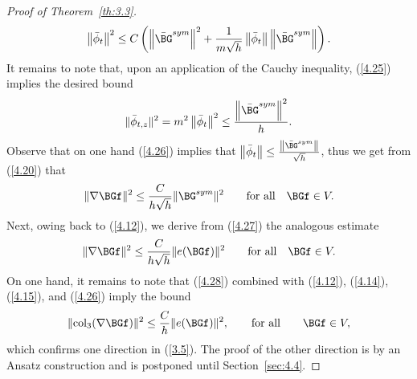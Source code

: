 \begin{proof}[Proof of Theorem~{\ref{th:3.3}}]
\begin{equation}
\label{4.25}
\norm{\bar\phi_t}^2\leq C\left(\norm{\bar\BG^{sym}}^2+\frac{1}{m\sqrt{h}}\norm{\bar\phi_t}\norm{\bar\BG^{sym}}\right).
\end{equation}
It remains to note that, upon an application of the Cauchy inequality, (\ref{4.25}) implies the desired bound
\begin{equation}
\label{4.26}
\|\bar \phi_{t,z}\|^2=m^2\norm{\bar \phi_t}^2\leq \frac{\norm{\bar \BG^{sym}}^2}{h}.
\end{equation}
Observe that on one hand (\ref{4.26}) implies that $\norm{\bar \phi_t}\leq \frac{\norm{\bar \BG^{sym}}}{\sqrt{h}}$, thus we get from (\ref{4.20}) that
\begin{equation}
\label{4.27}
\|\nabla\BGf\|^2\leq \frac{C}{h\sqrt{h}}\|\BG^{sym}\|^2 \qquad\text{for all}\quad \BGf\in V.
\end{equation}
Next, owing back to (\ref{4.12}), we derive from (\ref{4.27}) the analogous estimate 
\begin{equation}
\label{4.28}
\|\nabla\BGf\|^2\leq \frac{C}{h\sqrt{h}}\|e(\BGf)\|^2 \qquad\text{for all}\quad \BGf\in V.
\end{equation}
On one hand, it remains to note that (\ref{4.28}) combined with (\ref{4.12}), (\ref{4.14}), (\ref{4.15}), and (\ref{4.26}) imply the bound 
\begin{equation}
\label{4.29}
\|\mathrm{col}_3(\nabla\BGf)\|^2\leq\frac{C}{h}\|e(\BGf)\|^2,\qquad\text{for all}\qquad \BGf\in V,
\end{equation}
which confirms one direction in (\ref{3.5}). The proof of the other direction is by an Ansatz construction and is postponed until Section~\ref{sec:4.4}.


\end{proof}
